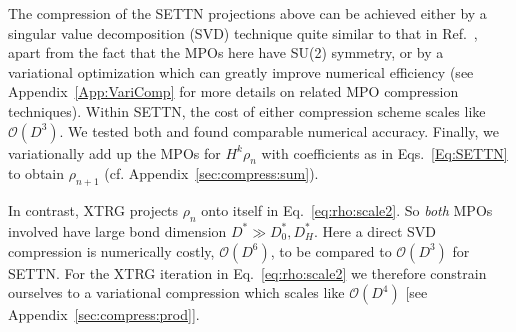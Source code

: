 \documentclass[aps,prx,twocolumn,showpacs,psfig,superscriptaddress,longbibliography]{revtex4-1}
\newcommand{\order}[1]{\mathcal{O}{\left(#1\right)}}
\newcommand{\App}[1]{Appendix~\ref{#1}}
\newcommand{\Eq}[1]{Eq.~\eqref{#1}}
\newcommand{\Eqs}[1]{Eqs.~\eqref{#1}}
\def\Dstar{D^\ast}
\begin{document}
The compression of the SETTN projections above can be achieved
either by a singular value decomposition (SVD) technique quite
similar to that in Ref.~\cite{Chen.b+:2017:SETTN}, apart from the
fact that the MPOs here have SU(2) symmetry, or by a variational
optimization which can greatly improve numerical efficiency (see
\App{App:VariComp} for more details on related MPO compression
techniques).  Within SETTN, the cost of either compression scheme
scales like $\order{D^3}$.  We tested both and found comparable
numerical accuracy.
%
Finally, we variationally add up the MPOs for $H^k \rho_n$ with
coefficients as in \Eqs{Eq:SETTN} to obtain $\rho_{n+1}$ (cf.
\App{sec:compress:sum}).

In contrast, XTRG projects $\rho_n$ onto itself in
\Eq{eq:rho:scale2}. So {\it both} MPOs involved have large bond
dimension $\Dstar \gg  \Dstar_{0}, \Dstar_H$.  Here a direct SVD
compression is numerically costly, $\order{D^6}$, to be compared to
$\order{D^3}$ for SETTN.  For the XTRG iteration in
\Eq{eq:rho:scale2} we therefore constrain ourselves to a variational
compression which scales like $\order{D^4}$ [see
\App{sec:compress:prod}].
\end{document}
